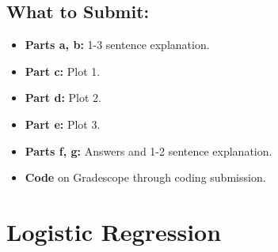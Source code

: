 \documentclass{article}
\begin{document}
\begin{aprob}
    \subsection*{What to Submit:}
    \begin{itemize}
        \item \textbf{Parts a, b:} 1-3 sentence explanation.
        \item \textbf{Part c:} Plot 1.
        \item \textbf{Part d:} Plot 2.
        \item \textbf{Part e:} Plot 3.
        \item \textbf{Parts f, g:} Answers and 1-2 sentence explanation.
        \item \textbf{Code} on Gradescope through coding submission.
    \end{itemize}
\end{aprob}

\section*{Logistic Regression}
\end{document}
